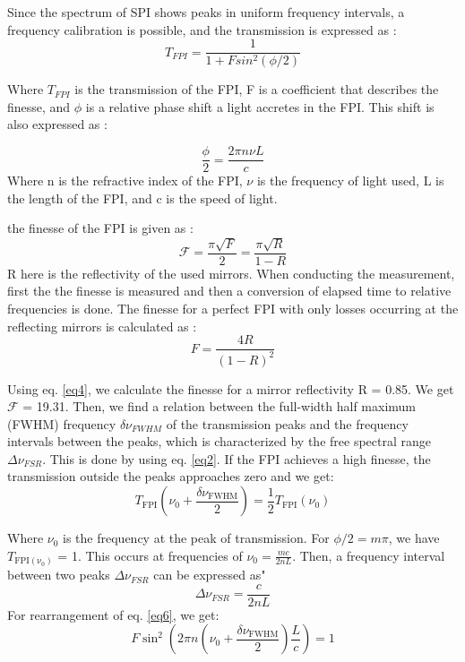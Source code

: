 \documentclass[12pt]{article}
\begin{document}
Since the spectrum of SPI shows peaks in uniform frequency intervals, a frequency calibration is possible, and the transmission is expressed as \cite{lecturenote}:
\begin{equation}
    T_{FPI} = \frac{1}{1 + F sin^{2}(\phi/2)}
    \label{eq2}
\end{equation}

Where $T_{FPI}$ is the transmission of the FPI, F is a coefficient that describes the finesse, and $\phi$ is a relative phase shift a light accretes in the FPI. This shift is also expressed as \cite{lecturenote}:

\begin{equation}
    \frac{\phi}{2} = \frac{2 \pi n \nu L}{c}
    \label{eq3}
\end{equation}
Where n is the refractive index of the FPI, $\nu$ is the frequency of light used, L is the length of the FPI, and c is the speed of light.

the finesse of the FPI is given as \cite{lecturenote}:
\begin{equation}
    \mathcal{F}=\frac{\pi \sqrt{F}}{2}=\frac{\pi \sqrt{R}}{1-R}
    \label{eq4}
\end{equation}
R here is the reflectivity of the used mirrors.
When conducting the measurement, first the the finesse is measured and then a conversion of elapsed time to relative frequencies is done. The finesse for a perfect FPI with only losses occurring at the reflecting mirrors is calculated as \cite{lecturenote}:
\begin{equation}
    F=\frac{4 R}{(1-R)^2}
    \label{eq5}
\end{equation}

Using eq. \ref{eq4}, we calculate the finesse for a mirror reflectivity R = 0.85. We get $\mathcal{F}$ = 19.31. 
Then, we find a relation between the full-width half maximum (FWHM) frequency $\delta \nu_{FWHM}$ of the transmission peaks and the frequency intervals between the peaks, which is characterized by the free spectral range $\Delta \nu_{FSR}$. This is done by using eq. \ref{eq2}. 
If the FPI achieves a high finesse, the transmission outside the peaks approaches zero and we get:
\begin{equation}
    T_{\mathrm{FPI}}\left(\nu_0+\frac{\delta \nu_{\mathrm{FWHM}}}{2}\right)=\frac{1}{2} T_{\mathrm{FPI}}\left(\nu_0\right)  
    \label{eq6}
\end{equation}

Where $\nu_0$ is the frequency at the peak of transmission. 
For $\phi/2 = m\pi$, we have $T_{\mathrm{FPI(\nu_0)}}$ = 1. This occurs at frequencies of $\nu_0 = \frac{mc}{2nL}$. Then, a frequency interval between two peaks $\Delta \nu_{FSR}$ can be expressed as"
\begin{equation}
    \Delta \nu_{FSR} = \frac{c}{2nL}
    \label{eq7}
\end{equation}
For rearrangement of eq. \ref{eq6}, we get: 
\begin{equation}
    F \sin ^2\left(2 \pi n\left(\nu_0+\frac{\delta \nu_{\mathrm{FWHM}}}{2}\right) \frac{L}{c}\right)=1
    \label{eq8}
\end{equation}
\end{document}

